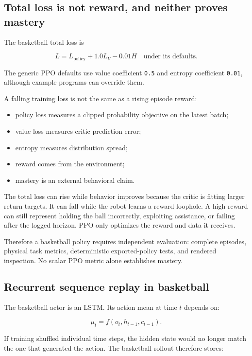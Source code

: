 \documentclass[
  american,
  11pt,
  letterpaper,
]{article}
\providecommand{\tightlist}{%
  \setlength{\itemsep}{0pt}\setlength{\parskip}{0pt}}
\begin{document}
\subsection{Total loss is not reward, and neither proves
mastery}\label{total-loss-is-not-reward-and-neither-proves-mastery}

The basketball total loss is

\[
L
=
L_{\mathrm{policy}}
+1.0L_V
-0.01H
\quad\text{under its defaults}.
\]

The generic PPO defaults use value coefficient \texttt{0.5} and entropy
coefficient \texttt{0.01}, although example programs can override them.

A falling training loss is not the same as a rising episode reward:

\begin{itemize}
\tightlist
\item
  policy loss measures a clipped probability objective on the latest
  batch;
\item
  value loss measures critic prediction error;
\item
  entropy measures distribution spread;
\item
  reward comes from the environment;
\item
  mastery is an external behavioral claim.
\end{itemize}

The total loss can rise while behavior improves because the critic is
fitting larger return targets. It can fall while the robot learns a
reward loophole. A high reward can still represent holding the ball
incorrectly, exploiting assistance, or failing after the logged horizon.
PPO only optimizes the reward and data it receives.

Therefore a basketball policy requires independent evaluation: complete
episodes, physical task metrics, deterministic exported-policy tests,
and rendered inspection. No scalar PPO metric alone establishes mastery.

\subsection{Recurrent sequence replay in
basketball}\label{recurrent-sequence-replay-in-basketball}

The basketball actor is an LSTM. Its action mean at time \(t\) depends
on:

\[
\mu_t=f(o_t,h_{t-1},c_{t-1}).
\]

If training shuffled individual time steps, the hidden state would no
longer match the one that generated the action. The basketball rollout
therefore stores:
\end{document}
